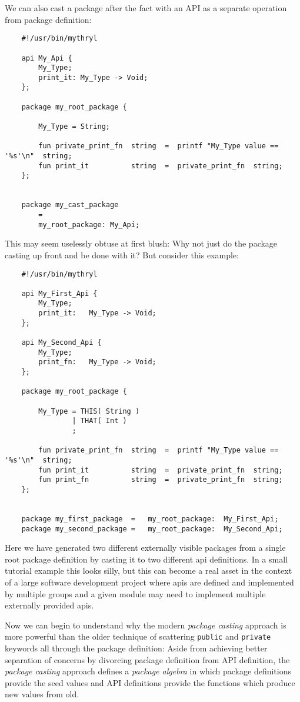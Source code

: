 We can also cast a package after the fact with an API as a separate operation from 
package definition:

\begin{verbatim}
    #!/usr/bin/mythryl

    api My_Api {
        My_Type;
        print_it: My_Type -> Void;
    };

    package my_root_package {

        My_Type = String;

        fun private_print_fn  string  =  printf "My_Type value == '%s'\n"  string;
        fun print_it          string  =  private_print_fn  string;
    };


    package my_cast_package
        =
        my_root_package: My_Api;
\end{verbatim}

This may seem uselessly obtuse at first blush:  Why not just do the 
package casting up front and be done with it?  But consider this example:

\begin{verbatim}
    #!/usr/bin/mythryl

    api My_First_Api {
        My_Type;
        print_it:   My_Type -> Void;
    };

    api My_Second_Api {
        My_Type;
        print_fn:   My_Type -> Void;
    };

    package my_root_package {

        My_Type = THIS( String )
                | THAT( Int )
                ; 

        fun private_print_fn  string  =  printf "My_Type value == '%s'\n"  string;
        fun print_it          string  =  private_print_fn  string;
        fun print_fn          string  =  private_print_fn  string;
    };


    package my_first_package  =   my_root_package:  My_First_Api;
    package my_second_package =   my_root_package:  My_Second_Api;
\end{verbatim}

Here we have generated two different externally visible packages from 
a single root package definition by casting it to two different api 
definitions.  In a small tutorial example this looks silly, but this 
can become a real asset in the context of a large software development 
project where apis are defined and implemented by multiple groups and 
a given module may need to implement multiple externally provided 
apis.

Now we can begin to understand why the modern {\it package casting} approach is 
more powerful than the older technique of scattering {\tt public} and 
{\tt private} keywords all through the package definition:  Aside from 
achieving better separation of concerns by divorcing package definition 
from API definition, the {\it package casting} approach defines a {\it package 
algebra} in which package definitions provide the seed values and 
API definitions provide the functions which produce new values from old.

